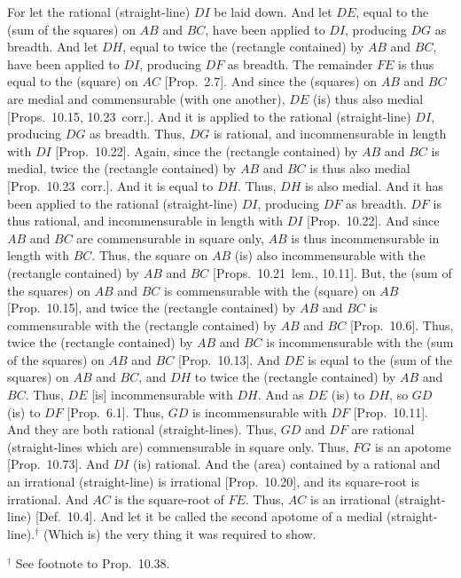 \begin{Parallel}{}{}
{For let the rational (straight-line) $DI$ be laid down. And let $DE$, equal
to the (sum of the squares) on $AB$ and $BC$, have been applied to
$DI$, producing $DG$ as breadth. And let $DH$, equal to twice the
(rectangle contained) by $AB$ and $BC$, have been applied to $DI$,
producing $DF$ as breadth. The remainder $FE$ is thus equal to the
(square) on $AC$ [Prop.~2.7]. And since the
(squares) on $AB$ and $BC$ are medial and commensurable (with one another), $DE$ (is) thus also medial [Props.~10.15, 10.23~corr.]. And it is applied to the
rational (straight-line) $DI$, producing $DG$ as breadth. Thus, $DG$
is rational, and incommensurable in length with $DI$ [Prop.~10.22].  Again, since the (rectangle contained)
by $AB$ and $BC$ is medial, twice the (rectangle contained) by $AB$
and $BC$ is thus also medial [Prop.~10.23~corr.]. 
And it is equal to $DH$. Thus, $DH$ is also medial. And it has been
applied to the rational (straight-line) $DI$, producing $DF$ as breadth.
$DF$ is thus rational, and incommensurable in length with $DI$
[Prop.~10.22].  And since $AB$ and $BC$ are commensurable in square only, $AB$ is thus incommensurable in length
with $BC$. Thus, the square on $AB$ (is) also incommensurable
with the (rectangle contained) by $AB$ and $BC$ [Props.~10.21~lem.,
10.11]. But, the (sum of the squares) on $AB$ and $BC$  is commensurable with the (square) on $AB$  [Prop.~10.15], and twice the (rectangle contained)
by $AB$ and $BC$ is commensurable with the (rectangle contained)
by $AB$ and $BC$ [Prop.~10.6]. Thus, twice
the (rectangle contained) by $AB$ and $BC$ is incommensurable
with the (sum of the squares) on $AB$ and $BC$ [Prop.~10.13]. And $DE$ is equal
to the (sum of the squares) on $AB$ and $BC$, and $DH$ to
twice the (rectangle contained) by $AB$ and $BC$. Thus, $DE$
[is] incommensurable with $DH$. And as $DE$ (is) to $DH$, so
$GD$ (is) to $DF$ [Prop.~6.1]. Thus,
$GD$ is incommensurable with $DF$ [Prop.~10.11]. And they are both rational (straight-lines). Thus, $GD$ and $DF$ are rational (straight-lines which are)
commensurable in square only.
Thus, $FG$ is an apotome [Prop.~10.73]. 
And $DI$ (is) rational. And the (area) contained by a rational and
an irrational (straight-line) is irrational [Prop.~10.20], and its square-root 
is irrational. And $AC$ is the square-root of $FE$. Thus, $AC$ is an
irrational (straight-line) [Def.~10.4]. And
let it be called the second apotome of a medial (straight-line).$^\dag$
(Which is) the very thing it
was required to show.}
\end{Parallel}
{\footnotesize\noindent$^\dag$ See footnote to Prop.~10.38.} 


